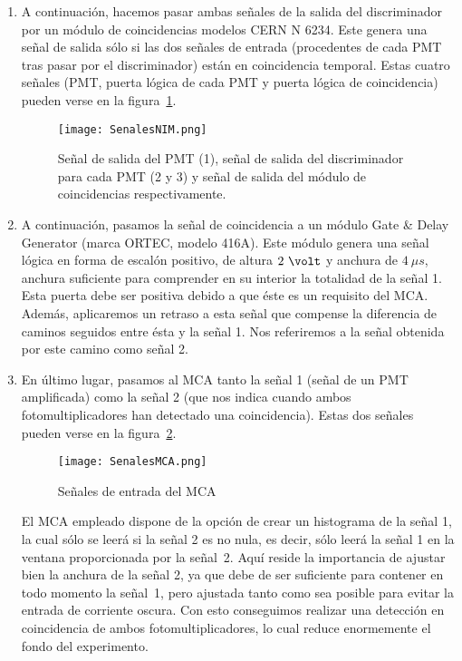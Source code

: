 \begin{enumerate}
\item{} A continuación, hacemos pasar ambas señales de la salida del discriminador por un módulo de coincidencias modelos CERN N 6234. Este genera una señal de salida  sólo si las dos señales de entrada (procedentes de cada PMT tras pasar por el discriminador) están en coincidencia temporal. 
Estas cuatro señales (PMT, puerta lógica de cada PMT y puerta lógica de coincidencia) pueden verse en la figura~\ref{señales}.

\begin{figure}[hbtp]
\centering
\texttt{[image: SenalesNIM.png]}
\caption{ Señal de salida del PMT (1), señal de salida del discriminador para cada PMT (2 y 3) y señal de salida del módulo de coincidencias respectivamente\label{señales}.}
\end{figure}


\item {} A continuación,  pasamos la señal de coincidencia a un módulo Gate \& Delay Generator (marca ORTEC, modelo 416A). Este módulo  genera una señal lógica en forma de escalón positivo, de altura $2~\volt$ y anchura de $4~\mu s$, anchura suficiente para comprender en su interior la totalidad de la señal 1. Esta puerta debe ser positiva debido a que éste es un requisito del MCA. Además, aplicaremos un retraso a esta señal que compense la diferencia de caminos seguidos entre ésta y la señal 1. Nos referiremos a la señal obtenida por este camino como señal 2.

\item {} En último lugar, pasamos al MCA tanto la señal 1 (señal de un PMT amplificada) como la señal 2 (que nos indica cuando ambos fotomultiplicadores han detectado una coincidencia). Estas dos señales pueden verse en la  figura~\ref{señales MCA}.

\begin{figure}[hbtp]
\centering
\texttt{[image: SenalesMCA.png]}
\caption{Señales de entrada del MCA\label{señales MCA}}
\end{figure}


El MCA  empleado dispone de la opción de crear un histograma de  la señal 1, la cual sólo  se leerá si la señal 2 es no nula, es decir, sólo leerá la señal 1 en la ventana proporcionada por la señal~2. Aquí reside la importancia de ajustar bien la anchura de la señal 2, ya que debe de ser suficiente para contener en todo momento la señal~1, pero ajustada tanto como sea posible para evitar la entrada de corriente oscura.
Con esto conseguimos realizar una detección en coincidencia de ambos fotomultiplicadores, lo cual reduce enormemente el fondo del experimento.

\end{enumerate}



